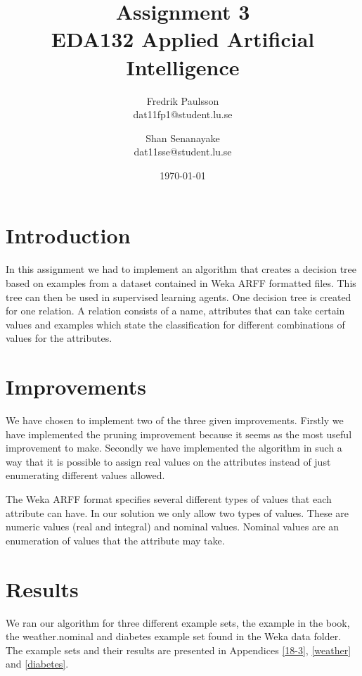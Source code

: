 \documentclass[a4paper]{article}
\title{Assignment 3 \\ EDA132 Applied Artificial Intelligence}
\date{\today}
\author{Fredrik Paulsson \\ dat11fp1@student.lu.se
\and Shan Senanayake \\ dat11sse@student.lu.se}
\begin{document}
\maketitle




\section{Introduction}
In this assignment we had to implement an algorithm that creates a decision tree based on examples from a dataset contained in Weka ARFF formatted files. This tree can then be used in supervised learning agents. One decision tree is created for one relation. A relation consists of a name, attributes that can take certain values and examples which state the classification for different combinations of values for the attributes.

\section{Improvements}
We have chosen to implement two of the three given improvements. Firstly we have implemented the pruning improvement because it seems as the most useful improvement to make. Secondly we have implemented the algorithm in such a way that it is possible to assign real values on the attributes instead of just enumerating different values allowed.

The Weka ARFF format specifies several different types of values that each attribute can have. In our solution we only allow two types of values. These are numeric values (real and integral) and nominal values. Nominal values are an enumeration of values that the attribute may take.

\section{Results}
We ran our algorithm for three different example sets, the example in the book, the weather.nominal and diabetes example set found in the Weka data folder. The example sets and their results are presented in Appendices \ref{18-3}, \ref{weather} and \ref{diabetes}.
\end{document}
